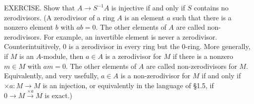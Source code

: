 EXERCISE. Show that $A \to S^{-1}A$ is injective if and only if $S$ contains no zerodivisors. (A zerodivisor of a ring $A$ is an element $a$ such that there is a nonzero element $b$ with $ab = 0$. The other elements of $A$ are called non-zerodivisors. For example, an invertible element is never a zerodivisor. Counterintuitively, $0$ is a zerodivisor in every ring but the $0$-ring. More generally, if $M$ is an $A$-module, then $a \in A$ is a zerodivisor for $M$ if there is a nonzero $m \in M$ with $am = 0$. The other elements of $A$ are called non-zerodivisors for $M$. Equivalently, and very usefully, $a \in A$ is a non-zerodivisor for $M$ if and only if $\times a : M \to M$ is an injection, or equivalently in the language of §1.5, if $0 \to M \xrightarrow{\times a} M$ is exact.)
